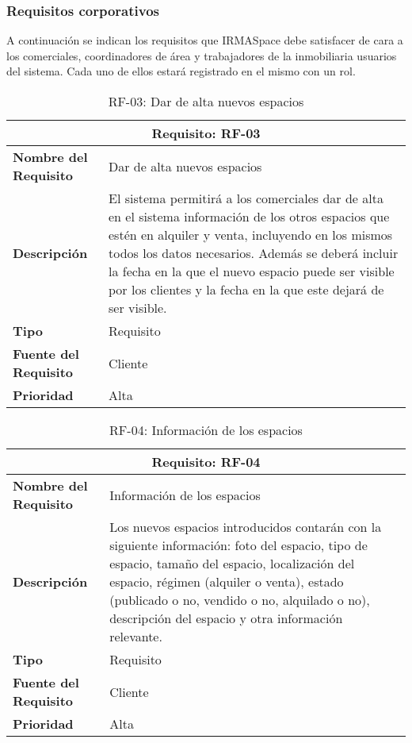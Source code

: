 \newpage
\subsubsection{Requisitos corporativos}

\par A continuación se indican los requisitos que IRMASpace debe satisfacer de cara a los comerciales, coordinadores de área y trabajadores de la inmobiliaria usuarios del sistema. Cada uno de ellos estará registrado en el mismo con un rol.

\begin{table}[H]
\begin{center}
\begin{tabular}{p{} p{7cm}}
\multicolumn{2}{c}{\textbf{Requisito: RF-03} } \\
\hline \hline
\textbf{Nombre del Requisito} & Dar de alta nuevos espacios  \\
\hline
\textbf{Descripción} & El sistema permitirá a los comerciales dar de alta en el sistema información de los otros espacios que estén en alquiler y venta, incluyendo en los mismos todos los datos necesarios. Además se deberá incluir la fecha en la que el nuevo espacio puede ser visible por los clientes y la fecha en la que este dejará de ser visible.\\
\hline
\textbf{Tipo} & Requisito  \\
\hline
\textbf{Fuente del Requisito} & Cliente \\
\hline
\textbf{Prioridad} &  Alta \\ \hline
\end{tabular}
\caption{RF-03: Dar de alta nuevos espacios}
\label{tab:RF-03}
\end{center}
\end{table}

\begin{table}[H]
\begin{center}
\begin{tabular}{p{} p{7cm}}
\multicolumn{2}{c}{\textbf{Requisito: RF-04} } \\
\hline \hline
\textbf{Nombre del Requisito} & Información de los espacios \\
\hline
\textbf{Descripción} & Los nuevos espacios introducidos contarán con la siguiente información: foto del espacio, tipo de espacio, tamaño del espacio, localización del espacio, régimen (alquiler o venta), estado (publicado o no, vendido o no, alquilado o no), descripción del espacio y otra información relevante.\\
\hline
\textbf{Tipo} & Requisito  \\
\hline
\textbf{Fuente del Requisito} & Cliente \\
\hline
\textbf{Prioridad} &  Alta \\ \hline
\end{tabular}
\caption{RF-04: Información de los espacios}
\label{tab:RF-04}
\end{center}
\end{table}

